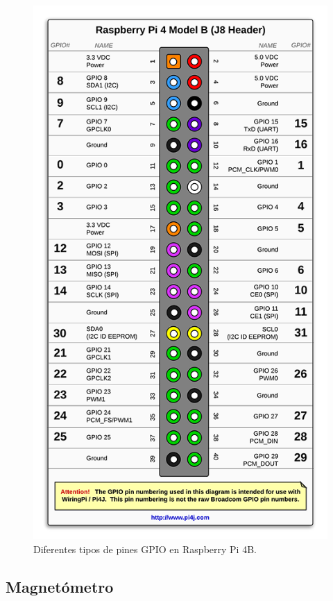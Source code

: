\begin{figure}[H]
  \centering
  \includegraphics[scale=0.4]{figs/pines} %
  \caption{Diferentes tipos de pines GPIO en Raspberry Pi 4B.}
  \label{fig:Pines}
\end{figure}


\subsection{Magnetómetro}
\label{subsec:magnetómetro}


